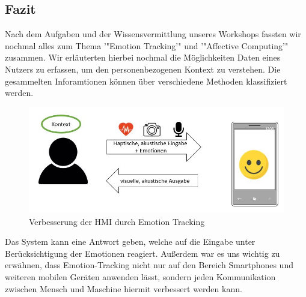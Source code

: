 \subsection{Fazit}

Nach dem Aufgaben und der Wissensvermittlung unseres Workshops fassten wir nochmal alles zum Thema '"Emotion Tracking'" und '"Affective Computing'" zusammen. Wir erläuterten hierbei nochmal die Möglichkeiten Daten eines Nutzers zu erfassen, um den personenbezogenen Kontext zu verstehen. Die gesammelten Inforamtionen können über verschiedene Methoden klassifiziert werden.

\begin{figure}[!ht]
	\centering
	\includegraphics[width=0.9\linewidth]{Pictures/Fazit_Grafik}
	\caption[Verbesserung der MMI durch Emotion Tracking]{Verbesserung der \ac{HMI} durch Emotion Tracking}
	\label{fig:fazitgrafik}
\end{figure}

Das System kann eine Antwort geben, welche auf die Eingabe unter Berücksichtigung der Emotionen reagiert. Außerdem war es uns wichtig zu erwähnen, dass Emotion-Tracking nicht nur auf den Bereich Smartphones und weiteren mobilen Geräten anwenden lässt, sondern jeden Kommunikation zwischen Mensch und Maschine hiermit verbessert werden kann. 
